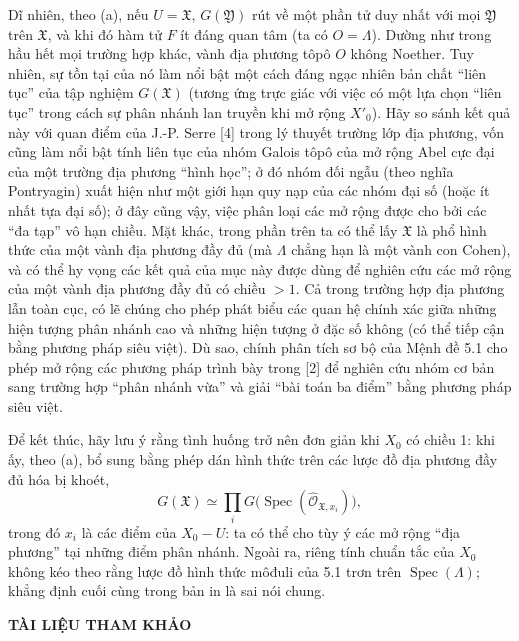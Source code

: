 Dĩ nhiên, theo (a), nếu $U=\mathfrak X$, $G(\mathfrak Y)$ rút về một phần tử
duy nhất với mọi $\mathfrak Y$ trên $\mathfrak X$, và khi đó hàm tử $F$ ít
đáng quan tâm (ta có $O=\Lambda$). Dường như trong hầu hết mọi trường hợp khác,
vành địa phương tôpô $O$ không Noether. Tuy nhiên, sự tồn tại của nó làm nổi
bật một cách đáng ngạc nhiên bản chất ``liên tục'' của tập nghiệm
$G(\mathfrak X)$ (tương ứng trực giác với việc có một lựa chọn ``liên tục''
trong cách sự phân nhánh lan truyền khi mở rộng $X'_0$). Hãy so sánh kết quả
này với quan điểm của J.-P. Serre [4] trong lý thuyết trường lớp địa phương,
vốn cũng làm nổi bật tính liên tục của nhóm Galois tôpô của mở rộng Abel cực
đại của một trường địa phương ``hình học''; ở đó nhóm đối ngẫu (theo nghĩa
Pontryagin) xuất hiện như một giới hạn quy nạp của các nhóm đại số (hoặc ít
nhất tựa đại số); ở đây cũng vậy, việc phân loại các mở rộng được cho bởi các
``đa tạp'' vô hạn chiều. Mặt khác, trong phần trên ta có thể lấy
$\mathfrak X$ là phổ hình thức của một vành địa phương đầy đủ (mà $\Lambda$
chẳng hạn là một vành con Cohen), và có thể hy vọng các kết quả của mục này
được dùng để nghiên cứu các mở rộng của một vành địa phương đầy đủ có chiều
$>1$. Cả trong trường hợp địa phương lẫn toàn cục, có lẽ chúng cho phép phát
biểu các quan hệ chính xác giữa những hiện tượng phân nhánh cao và những hiện
tượng ở đặc số không (có thể tiếp cận bằng phương pháp siêu việt). Dù sao,
chính phân tích sơ bộ của Mệnh đề 5.1 cho phép mở rộng các phương pháp trình
bày trong [2] để nghiên cứu nhóm cơ bản sang trường hợp ``phân nhánh vừa'' và
giải ``bài toán ba điểm'' bằng phương pháp siêu việt.

Để kết thúc, hãy lưu ý rằng tình huống trở nên đơn giản khi $X_0$ có chiều 1:
khi ấy, theo (a), bổ sung bằng phép dán hình thức trên các lược đồ địa phương
đầy đủ hóa bị khoét,
\[
  G(\mathfrak X)\simeq
  \prod_iG\bigl(\operatorname{Spec}(\widehat{\mathcal O}_{\mathfrak X,x_i})\bigr),
\]
trong đó $x_i$ là các điểm của $X_0-U$: ta có thể cho tùy ý các mở rộng ``địa
phương'' tại những điểm phân nhánh. Ngoài ra, riêng tính chuẩn tắc của $X_0$
không kéo theo rằng lược đồ hình thức môđuli của 5.1 trơn trên
$\operatorname{Spec}(\Lambda)$; khẳng định cuối cùng trong bản in là sai nói
chung.

\begin{center}
  \textbf{TÀI LIỆU THAM KHẢO}
\end{center}

